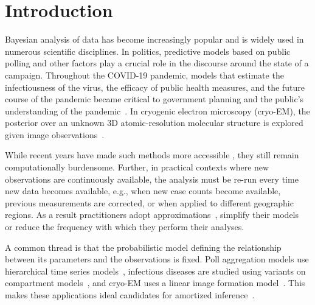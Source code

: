 \vspace{-9mm}
\section{Introduction}
\vspace{-1mm}
\label{sec:intro}
Bayesian analysis of data has become increasingly popular and is widely used in numerous scientific disciplines.
In politics, predictive models based on public polling and other factors play a crucial role in the discourse around the state of a campaign.
Throughout the COVID-19 pandemic, models that estimate the infectiousness of the virus, the efficacy of public health measures, and the future course of the pandemic became critical to government planning and the public's understanding of the pandemic~\citep{Cooper2020-covidmodel}. In cryogenic electron microscopy (cryo-EM), the posterior over an unknown 3D atomic-resolution molecular structure is explored given image observations~\citep{Glaeser2021-cryoem}. 

While recent years have made such methods more accessible \citep{bingham2019pyro,carpenter2017stan,StatSoftReview}, they still remain computationally burdensome.
Further, in practical contexts where new observations are continuously available, the analysis must be re-run every time new data becomes available, e.g., when new case counts become available, previous measurements are corrected, or when applied to different geographic regions.
As a result practitioners adopt approximations~\citep{welling2011bayesian,gelfand2000gibbs,brooks1998markov}, simplify their models~\citep{hoffman2013stochastic,blei2017variational} or reduce the frequency with which they perform their analyses.

A common thread is that the probabilistic model defining the relationship between its parameters and the observations is fixed. Poll aggregation models use hierarchical time series models~\citep{Athanasopoulos-hierarchicalts,chen2023-pollaggregation}, infectious diseases are studied using variants on compartment models~\citep{Tang2020-diseasemodels}, and cryo-EM uses a linear image formation model~\citep{Glaeser2021-cryoem}. This makes these applications ideal candidates for amortized inference~\citep{morris2013recognition,paige2016inference,kingma2013auto,rezende2014stochastic,stuhlmuller2013learning}.

